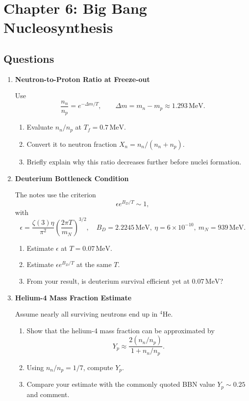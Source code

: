 \clearpage
\section{Chapter 6: Big Bang Nucleosynthesis}

\subsection{Questions}

\begin{enumerate}[label=6.\arabic*]
  \item \label{q:6.1} \textbf{Neutron-to-Proton Ratio at Freeze-out}

  Use
  \[
    \frac{n_n}{n_p}=e^{-\Delta m/T},\qquad \Delta m = m_n-m_p \approx 1.293\,\mathrm{MeV}.
  \]
  \begin{enumerate}[label=(\alph*)]
    \item Evaluate $n_n/n_p$ at $T_f=0.7\,\mathrm{MeV}$.
    \item Convert it to neutron fraction $X_n = n_n/(n_n+n_p)$.
    \item Briefly explain why this ratio decreases further before nuclei formation.
  \end{enumerate}

  \item \label{q:6.2} \textbf{Deuterium Bottleneck Condition}

  The notes use the criterion
  \[
    \epsilon e^{B_D/T}\sim 1,
  \]
  with
  \[
    \epsilon = \frac{\zeta(3)\eta}{\pi^2}\left(\frac{2\pi T}{m_N}\right)^{3/2},
    \quad B_D=2.2245\,\mathrm{MeV},\ \eta=6\times10^{-10},\ m_N=939\,\mathrm{MeV}.
  \]
  \begin{enumerate}[label=(\alph*)]
    \item Estimate $\epsilon$ at $T=0.07\,\mathrm{MeV}$.
    \item Estimate $\epsilon e^{B_D/T}$ at the same $T$.
    \item From your result, is deuterium survival efficient yet at $0.07\,\mathrm{MeV}$?
  \end{enumerate}

  \item \label{q:6.3} \textbf{Helium-4 Mass Fraction Estimate}

  Assume nearly all surviving neutrons end up in ${}^4\mathrm{He}$.
  \begin{enumerate}[label=(\alph*)]
    \item Show that the helium-4 mass fraction can be approximated by
    \[
      Y_p \approx \frac{2(n_n/n_p)}{1+n_n/n_p}.
    \]
    \item Using $n_n/n_p=1/7$, compute $Y_p$.
    \item Compare your estimate with the commonly quoted BBN value $Y_p\sim 0.25$ and comment.
  \end{enumerate}
\end{enumerate}

